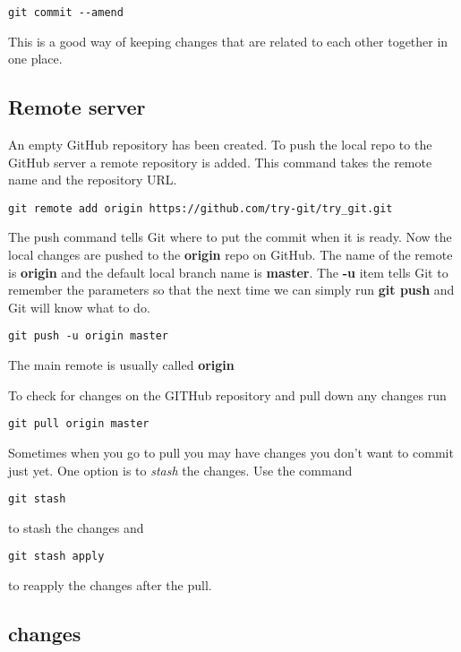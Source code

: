\documentclass[11pt]{article} %
\begin{document}
\begin{lstlisting}
git commit --amend 
\end{lstlisting}

This is a good way of keeping changes that are related to each other together in one place. 

\subsection{Remote server}
An empty GitHub repository has been created.  To push the local repo to the GitHub server a remote repository is added.  This command takes the remote name and the repository URL.  

\begin{lstlisting}
git remote add origin https://github.com/try-git/try_git.git 
\end{lstlisting}

The push command tells Git where to put the commit when it is ready. Now the local changes are pushed to the \textbf{origin} repo on GitHub.  The name of the remote is \textbf{origin} and the default local branch name is \textbf{master}.  The \textbf{-u} item tells Git to remember the parameters so that the next time we can simply run \textbf{git push} and Git will know what to do. 

\begin{lstlisting}
git push -u origin master 
\end{lstlisting}

 
The main remote is usually called \textbf{origin}

To check for changes on the GITHub repository and pull down any changes run

\begin{lstlisting}
git pull origin master   
\end{lstlisting}

Sometimes when you go to pull you may have changes you don't want to commit just yet.  One option is to \emph{stash} the changes.  Use the command 

\begin{lstlisting}
git stash 
\end{lstlisting}
to stash the changes and 
\begin{lstlisting}
git stash apply  
\end{lstlisting}
to reapply the changes after the pull.

\subsection{changes}
\end{document}
